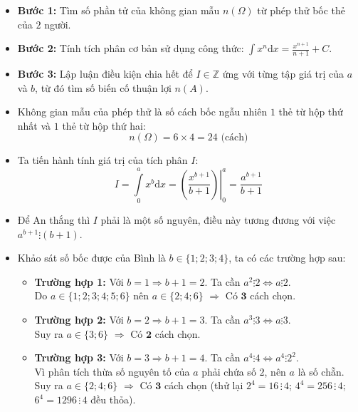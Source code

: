 \documentclass[12pt,a4paper]{article}
\begin{document}
\begin{ex}
{\begin{bodembox}
\begin{itemize}
    \item \textbf{Bước 1:} Tìm số phần tử của không gian mẫu $n(\Omega)$ từ phép thử bốc thẻ của $2$ người.
    \item \textbf{Bước 2:} Tính tích phân cơ bản sử dụng công thức: $\displaystyle\int x^n \mathrm{d}x = \displaystyle\frac{x^{n+1}}{n+1} + C$.
    \item \textbf{Bước 3:} Lập luận điều kiện chia hết để $I \in \mathbb{Z}$ ứng với từng tập giá trị của $a$ và $b$, từ đó tìm số biến cố thuận lợi $n(A)$.
\end{itemize}
\end{bodembox}

\begin{apdungbox}
\begin{itemize}
    \item Không gian mẫu của phép thử là số cách bốc ngẫu nhiên $1$ thẻ từ hộp thứ nhất và $1$ thẻ từ hộp thứ hai:
    \[ n(\Omega) = 6 \times 4 = 24 \text{ (cách)} \]
    
    \item Ta tiến hành tính giá trị của tích phân $I$:
    \[ I = \displaystyle\int\limits_{0}^{a} x^b \mathrm{d}x = \left. \left( \displaystyle\frac{x^{b+1}}{b+1} \right) \right|_{0}^{a} = \displaystyle\frac{a^{b+1}}{b+1} \]
    
    \item Để An thắng thì $I$ phải là một số nguyên, điều này tương đương với việc $a^{b+1} \vdots (b+1)$.
    \item Khảo sát số bốc được của Bình là $b \in \{1; 2; 3; 4\}$, ta có các trường hợp sau:
    \begin{itemize}
        \item \textbf{Trường hợp 1:} Với $b=1 \Rightarrow b+1=2$. Ta cần $a^2 \vdots 2 \Leftrightarrow a \vdots 2$. \\
        Do $a \in \{1; 2; 3; 4; 5; 6\}$ nên $a \in \{2; 4; 6\}$ $\Rightarrow$ Có $\mathbf{3}$ cách chọn.
        
        \item \textbf{Trường hợp 2:} Với $b=2 \Rightarrow b+1=3$. Ta cần $a^3 \vdots 3 \Leftrightarrow a \vdots 3$. \\
        Suy ra $a \in \{3; 6\}$ $\Rightarrow$ Có $\mathbf{2}$ cách chọn.
        
        \item \textbf{Trường hợp 3:} Với $b=3 \Rightarrow b+1=4$. Ta cần $a^4 \vdots 4 \Leftrightarrow a^4 \vdots 2^2$. \\
        Vì phân tích thừa số nguyên tố của $a$ phải chứa số $2$, nên $a$ là số chẵn. \\
        Suy ra $a \in \{2; 4; 6\}$ $\Rightarrow$ Có $\mathbf{3}$ cách chọn (thử lại $2^4=16\,\vdots\,4$; $4^4=256\,\vdots\,4$; $6^4=1296\,\vdots\,4$ đều thỏa).
        

\end{itemize}
\end{itemize}
\end{apdungbox}}
\end{ex}
\end{document}
